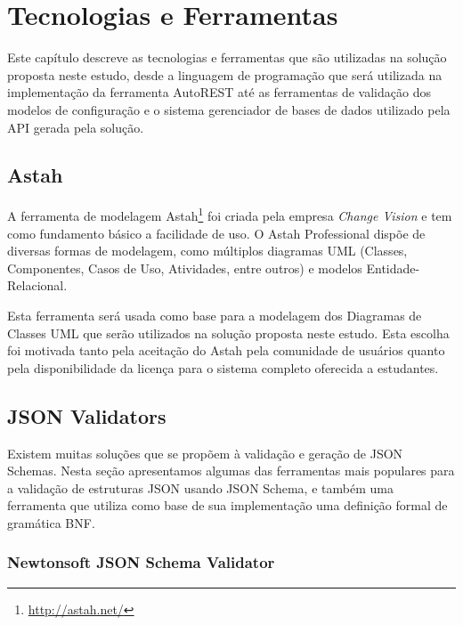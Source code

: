 \chapter{Tecnologias e Ferramentas}
\label{chap:tecno}

Este capítulo descreve as tecnologias e ferramentas que são utilizadas na solução proposta neste estudo, desde a linguagem de programação que será utilizada na implementação da ferramenta AutoREST até as ferramentas de validação dos modelos de configuração e o sistema gerenciador de bases de dados utilizado pela API gerada pela solução.


\section{Astah}

A ferramenta de modelagem Astah\footnote{\url{http://astah.net/}} foi criada pela empresa \textit{Change Vision} e tem como fundamento básico a facilidade de uso. O Astah Professional dispõe de diversas formas de modelagem, como múltiplos diagramas UML (Classes, Componentes, Casos de Uso, Atividades, entre outros) e modelos Entidade-Relacional.

Esta ferramenta será usada como base para a modelagem dos Diagramas de Classes UML que serão utilizados na solução proposta neste estudo. Esta escolha foi motivada tanto pela aceitação do Astah pela comunidade de usuários quanto pela disponibilidade da licença para o sistema completo oferecida a estudantes.


\section{JSON Validators}

Existem muitas soluções que se propõem à validação e geração de JSON Schemas. Nesta seção apresentamos algumas das ferramentas mais populares para a validação de estruturas JSON usando JSON Schema, e também uma ferramenta que utiliza como base de sua implementação uma definição formal de gramática BNF.


\subsection{Newtonsoft JSON Schema Validator}

